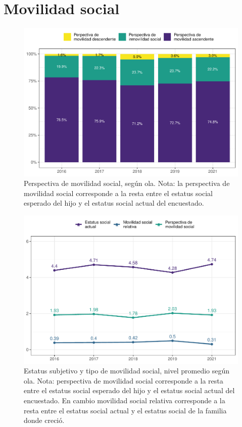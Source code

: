 \documentclass[
  12pt,
]{book}
\begin{document}
\hypertarget{movilidad-social}{%
\section{Movilidad social}\label{movilidad-social}}

\begin{figure}

{\centering \includegraphics{reporte-elsoc_files/figure-latex/mov-soc-rec-1} 

}

\caption{Perspectiva de movilidad social, según ola.
Nota: la perspectiva de movilidad social corresponde a la resta entre el estatus social esperado del hijo y el estatus social actual del encuestado.}\label{fig:mov-soc-rec}
\end{figure}

\begin{figure}

{\centering \includegraphics{reporte-elsoc_files/figure-latex/mov-soc-1} 

}

\caption{Estatus subjetivo y tipo de movilidad social, nivel promedio según ola.
Nota: perspectiva de movilidad social corresponde a la resta entre el estatus social esperado del hijo y el estatus social actual del encuestado. En cambio movilidad social relativa corresponde a la resta entre el estatus social actual y el estatus social de la familia donde creció.}\label{fig:mov-soc}
\end{figure}
\end{document}

